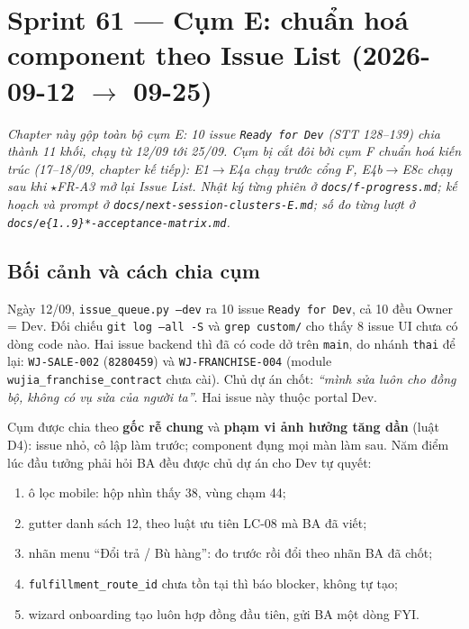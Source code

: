\chapter{Sprint 61 --- Cụm E: chuẩn hoá component theo Issue List (2026-09-12 $\to$ 09-25)}

\emph{Chapter này gộp toàn bộ cụm E: 10 issue \texttt{Ready for Dev} (STT 128--139) chia thành
11 khối, chạy từ 12/09 tới 25/09. Cụm bị cắt đôi bởi cụm F chuẩn hoá kiến trúc (17--18/09,
chapter kế tiếp): E1$\to$E4a chạy trước cổng F, E4b$\to$E8c chạy sau khi $\star$FR-A3 mở lại Issue List.
Nhật ký từng phiên ở \texttt{docs/f-progress.md}; kế hoạch và prompt ở
\texttt{docs/next-session-clusters-E.md}; số đo từng lượt ở
\texttt{docs/e\{1..9\}*-acceptance-matrix.md}.}

\section{Bối cảnh và cách chia cụm}

Ngày 12/09, \texttt{issue\_queue.py --dev} ra 10 issue \texttt{Ready for Dev}, cả 10 đều Owner = Dev.
Đối chiếu \texttt{git log --all -S} và \texttt{grep custom/} cho thấy 8 issue UI chưa có dòng code nào.
Hai issue backend thì đã có code dở trên \texttt{main}, do nhánh \texttt{thai} để lại: \texttt{WJ-SALE-002}
(\texttt{8280459}) và \texttt{WJ-FRANCHISE-004} (module \texttt{wujia\_franchise\_contract} chưa cài).
Chủ dự án chốt: \emph{``mình sửa luôn cho đồng bộ, không có vụ sửa của người ta''}. Hai issue này
thuộc portal Dev.

Cụm được chia theo \textbf{gốc rễ chung} và \textbf{phạm vi ảnh hưởng tăng dần} (luật D4):
issue nhỏ, cô lập làm trước; component đụng mọi màn làm sau. Năm điểm lúc đầu tưởng phải hỏi BA
đều được chủ dự án cho Dev tự quyết:
\begin{enumerate}[nosep]
\item ô lọc mobile: hộp nhìn thấy 38, vùng chạm 44;
\item gutter danh sách 12, theo luật ưu tiên LC-08 mà BA đã viết;
\item nhãn menu ``Đổi trả / Bù hàng'': đo trước rồi đổi theo nhãn BA đã chốt;
\item \texttt{fulfillment\_route\_id} chưa tồn tại thì báo blocker, không tự tạo;
\item wizard onboarding tạo luôn hợp đồng đầu tiên, gửi BA một dòng FYI.
\end{enumerate}

